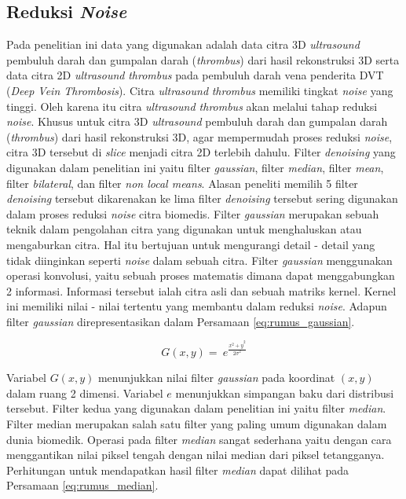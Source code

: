 {%


\subsection{Reduksi \textit{Noise}}
Pada penelitian ini data yang digunakan adalah data citra 3D \textit{ultrasound} pembuluh darah dan gumpalan darah (\textit{thrombus}) dari hasil rekonstruksi 3D serta data citra 2D \textit{ultrasound} \textit{thrombus} pada pembuluh darah vena penderita DVT (\textit{Deep Vein Thrombosis}). Citra \textit{ultrasound} \textit{thrombus} memiliki tingkat \textit{noise} yang tinggi. Oleh karena itu citra \textit{ultrasound thrombus} akan melalui tahap reduksi \textit{noise}. Khusus untuk citra 3D \textit{ultrasound} pembuluh darah dan gumpalan darah (\textit{thrombus}) dari hasil rekonstruksi 3D, agar mempermudah proses reduksi \textit{noise}, citra 3D tersebut di \textit{slice} menjadi citra 2D terlebih dahulu. Filter \textit{denoising} yang digunakan dalam penelitian ini yaitu filter \textit{gaussian}, filter \textit{median}, filter \textit{mean}, filter \textit{bilateral}, dan filter \textit{non local means}. Alasan peneliti memilih 5 filter \textit{denoising} tersebut dikarenakan ke lima filter \textit{denoising} tersebut sering digunakan dalam proses reduksi \textit{noise} citra biomedis. Filter \textit{gaussian} merupakan sebuah teknik dalam pengolahan citra yang digunakan untuk menghaluskan atau mengaburkan citra. Hal itu bertujuan untuk mengurangi detail - detail yang tidak diinginkan seperti \textit{noise} dalam sebuah citra. 
Filter \textit{gaussian} menggunakan operasi konvolusi, yaitu sebuah proses matematis dimana dapat menggabungkan 2 informasi. Informasi tersebut ialah citra asli dan sebuah matriks kernel. Kernel ini memiliki nilai - nilai tertentu yang membantu dalam reduksi \textit{noise}. Adapun filter \textit{gaussian} direpresentasikan dalam Persamaan \ref{eq:rumus_gaussian}.

\begin{equation}
	G\left(x,y\right)=\ e^\frac{{x^2+y}^2}{2\sigma^2}
	\label{eq:rumus_gaussian}
\end{equation}

Variabel $G(x,y)$ menunjukkan nilai filter \textit{gaussian} pada koordinat $(x,y)$ dalam ruang 2 dimensi. Variabel $e$ menunjukkan simpangan baku dari distribusi tersebut. Filter kedua yang digunakan dalam penelitian ini yaitu filter \textit{median}. Filter median merupakan salah satu filter yang paling umum digunakan dalam dunia biomedik. Operasi pada filter \textit{median} sangat sederhana yaitu dengan cara menggantikan nilai piksel tengah dengan nilai median dari piksel tetangganya. Perhitungan untuk mendapatkan hasil filter \textit{median} dapat dilihat pada Persamaan \ref{eq:rumus_median}.

}
